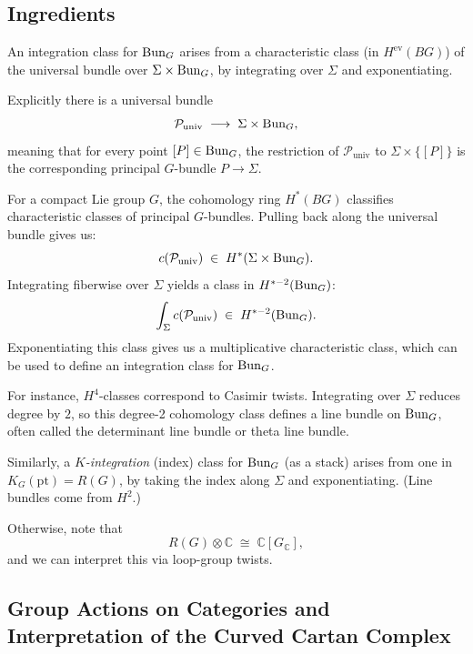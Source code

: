 \documentclass[12pt]{article}
\begin{document}
\subsection*{Ingredients}
An integration class for $\operatorname{Bun}_G$ arises from a characteristic class
(in $H^{\mathrm{ev}}(BG)$)
of the universal bundle over $\Sigma \times \operatorname{Bun}_G$,
by integrating over $\Sigma$ and exponentiating.

Explicitly there is a universal bundle
\[
\mathcal{P}_{\mathrm{univ}} \;\longrightarrow\; \Sigma \times \operatorname{Bun}_G,
\]
meaning that for every point $[P] \in \operatorname{Bun}_G$, the restriction of $\mathcal{P}_{\mathrm{univ}}$ to $\Sigma \times \{[P]\}$ is the corresponding principal $G$-bundle $P \to \Sigma$.

For a compact Lie group $G$, the cohomology ring $H^*(BG)$ classifies characteristic classes of principal $G$-bundles. Pulling back along the universal bundle gives us:
\[
c(\mathcal{P}_{\mathrm{univ}}) \;\in\; H^*(\Sigma \times \operatorname{Bun}_G).
\]
Integrating fiberwise over $\Sigma$ yields a class in $H^{*-2}(\operatorname{Bun}_G)$:
\[\int_\Sigma c(\mathcal{P}_{\mathrm{univ}}) \;\in\; H^{*-2}(\operatorname{Bun}_G).\]
Exponentiating this class gives us a multiplicative characteristic class, which can be used to define an integration class for $\operatorname{Bun}_G$.

For instance, $H^4$-classes correspond to Casimir twists. Integrating over $\Sigma$ reduces degree by $2$,
so this degree-2 cohomology class defines a line bundle on \( \operatorname{Bun}_G \), often called the determinant line bundle or theta line bundle.

\medskip
Similarly, a \emph{$K$-integration} (index) class for $\operatorname{Bun}_G$ (as a stack)
arises from one in $K_G(\mathrm{pt}) = R(G)$,
by taking the index along $\Sigma$ and exponentiating.
(Line bundles come from $H^2$.)

\medskip
Otherwise, note that
\[
R(G) \otimes \mathbb{C} \;\cong\; \mathbb{C}[G_{\! \mathbb{C}}],
\]
and we can interpret this via loop-group twists.

\subsection{Group Actions on Categories and Interpretation of the Curved Cartan Complex}
\end{document}
